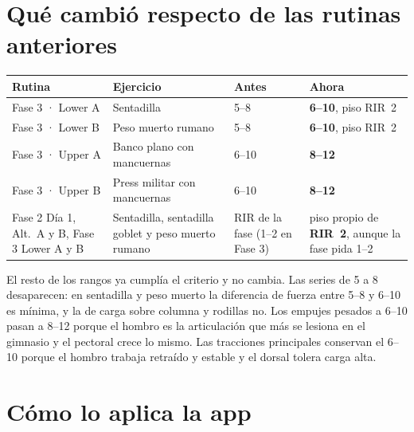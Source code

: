 \documentclass[11pt,a4paper]{article}
\newcommand{\rango}[1]{\textbf{#1}}
\begin{document}
\section{Qué cambió respecto de las rutinas anteriores}

\begin{longtable}{L{3.4cm} L{4.4cm} L{2.4cm} L{4.4cm}}
\toprule
\textbf{Rutina} & \textbf{Ejercicio} & \textbf{Antes} & \textbf{Ahora} \\
\midrule
\endhead
Fase 3 · Lower A & Sentadilla & 5--8 & \rango{6--10}, piso RIR~2 \\
Fase 3 · Lower B & Peso muerto rumano & 5--8 & \rango{6--10}, piso RIR~2 \\
Fase 3 · Upper A & Banco plano con mancuernas & 6--10 & \rango{8--12} \\
Fase 3 · Upper B & Press militar con mancuernas & 6--10 & \rango{8--12} \\
Fase 2 Día 1, Alt.\ A y B, Fase 3 Lower A y B & Sentadilla, sentadilla goblet y peso muerto rumano & RIR de la fase (1--2 en Fase 3) & piso propio de \rango{RIR~2}, aunque la fase pida 1--2 \\
\bottomrule
\end{longtable}

El resto de los rangos ya cumplía el criterio y no cambia. Las series de 5 a 8 desaparecen: en sentadilla y peso muerto la diferencia de fuerza entre 5--8 y 6--10 es mínima, y la de carga sobre columna y rodillas no. Los empujes pesados a 6--10 pasan a 8--12 porque el hombro es la articulación que más se lesiona en el gimnasio y el pectoral crece lo mismo. Las tracciones principales conservan el 6--10 porque el hombro trabaja retraído y estable y el dorsal tolera carga alta.

\section{Cómo lo aplica la app}
\end{document}
